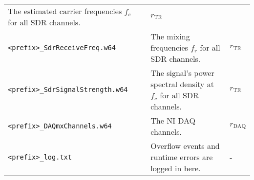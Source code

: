 \documentclass[10pt]{article}
\begin{document}
\begin{longtable}[]{@{}lll@{}}
\begin{minipage}[t]{0.18\columnwidth}
The estimated carrier frequencies \(f_c\) for all SDR
channels.\strut
\end{minipage} & \begin{minipage}[t]{0.18\columnwidth}\raggedright\strut
\(r_\text{TR}\)\strut
\end{minipage}\tabularnewline
\begin{minipage}[t]{0.13\columnwidth}\raggedright\strut
\texttt{\textless{}prefix\textgreater{}\_SdrReceiveFreq.w64}\strut
\end{minipage} & \begin{minipage}[t]{0.18\columnwidth}\raggedright\strut
The mixing frequencies \(f_r\) for all SDR channels.\strut
\end{minipage} & \begin{minipage}[t]{0.18\columnwidth}\raggedright\strut
\(r_\text{TR}\)\strut
\end{minipage}\tabularnewline
\begin{minipage}[t]{0.13\columnwidth}\raggedright\strut
\texttt{\textless{}prefix\textgreater{}\_SdrSignalStrength.w64}\strut
\end{minipage} & \begin{minipage}[t]{0.18\columnwidth}\raggedright\strut
The signal's power spectral density at \(f_c\) for all SDR
channels.\strut
\end{minipage} & \begin{minipage}[t]{0.18\columnwidth}\raggedright\strut
\(r_\text{TR}\)\strut
\end{minipage}\tabularnewline
\begin{minipage}[t]{0.13\columnwidth}\raggedright\strut
\texttt{\textless{}prefix\textgreater{}\_DAQmxChannels.w64}\strut
\end{minipage} & \begin{minipage}[t]{0.18\columnwidth}\raggedright\strut
The NI DAQ channels.\strut
\end{minipage} & \begin{minipage}[t]{0.18\columnwidth}\raggedright\strut
\(r_\text{DAQ}\)\strut
\end{minipage}\tabularnewline
\begin{minipage}[t]{0.13\columnwidth}\raggedright\strut
\texttt{\textless{}prefix\textgreater{}\_log.txt}\strut
\end{minipage} & \begin{minipage}[t]{0.18\columnwidth}\raggedright\strut
Overflow events and runtime errors are logged in here.\strut
\end{minipage} & \begin{minipage}[t]{0.18\columnwidth}\raggedright\strut
-\strut
\end{minipage}\tabularnewline
\bottomrule
\end{longtable}
\end{document}
